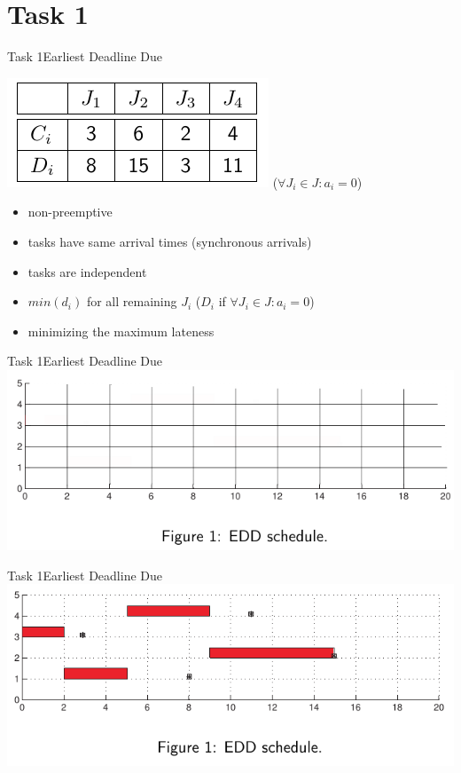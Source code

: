 
\section{Task 1}

\setcounter{task}{1}

\begin{frame}{Task 1}{Earliest Deadline Due}
  \vspace{0.5cm}
  \begin{task}
    \centering
    \includegraphics[height=0.2\paperheight]{./figures/1_tab.png}
    ($\forall J_i \in J: a_i = 0$)
  \end{task}
  \begin{requirements}
    \begin{itemize}
      \item \alert{non-preemptive}
      \item tasks have \alert{same arrival times} (synchronous arrivals)
      \item tasks are \alert{independent}
      \item $min(d_i)$ for all remaining $J_i$ ($D_i$ if $\forall J_i\in J: a_i=0$)
      \item \alert{minimizing} the \alert{maximum lateness}
    \end{itemize}
    \centering
  \end{requirements}
\end{frame}

\begin{frame}{Task 1}{Earliest Deadline Due}
  \includegraphics[width=\textwidth]{./figures/1_empty.png}
\end{frame}

\begin{frame}{Task 1}{Earliest Deadline Due}
  \includegraphics[width=\textwidth]{./figures/1_sol.png}
\end{frame}
